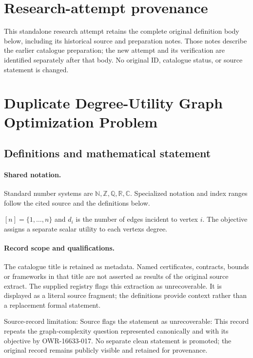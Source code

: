\documentclass[11pt]{article}
\begin{document}
\section*{Research-attempt provenance}
This standalone research attempt retains the complete original definition body below,
including its historical source and preparation notes. Those notes describe the
earlier catalogue preparation; the new attempt and its verification are identified
separately after that body. No original ID, catalogue status, or source statement is changed.

\section{Duplicate Degree-Utility Graph Optimization Problem}\label{statement}

\subsection{Definitions and mathematical statement}

\paragraph{Shared notation.}Standard number systems are $\mathbb N,\mathbb Z,\mathbb Q,\mathbb R,\mathbb C$. Specialized notation and index ranges follow the cited source and the definitions below.


$[n]=\{1,\ldots,n\}$ and $d_i$ is the number of edges incident to vertex $i$. The objective assigns a separate scalar utility to each vertex\textquotesingle s degree.
\paragraph{Record scope and qualifications.}
The catalogue title is retained as metadata. Named certificates, contracts, bounds or frameworks in that title are not asserted as results of the original source extract.
The supplied registry flags this extraction as unrecoverable. It is displayed as a literal source fragment; the definitions provide context rather than a replacement formal statement.

Source-record limitation: Source flags the statement as unrecoverable: This record repeats the graph-complexity question represented canonically and with its objective by OWR-16633-017. No separate clean statement is promoted; the original record remains publicly visible and retained for provenance.
\end{document}
